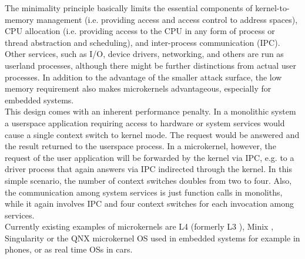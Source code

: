 The minimality principle basically limits the essential components of kernel-to-memory management (i.e. providing access and access control to address spaces), CPU allocation (i.e. providing access to the CPU in any form of process or thread abstraction and scheduling), and inter-process communication (IPC). Other services, such as I/O, device drivers, networking, and others are run as userland processes, although there might be further distinctions from actual user processes. In addition to the advantage of the smaller attack surface, the low memory requirement also makes microkernels advantageous, especially for embedded systems. \\

This design comes with an inherent performance penalty. In a monolithic system a userspace application requiring access to hardware or system services would cause a single context switch to kernel mode. The request would be answered and the result returned to the userspace process. In a microkernel, however, the request of the user application will be forwarded by the kernel via IPC, e.g. to a driver process that again answers via IPC indirected through the kernel. In this simple scenario, the number of context switches doubles from two to four. Also, the communication among system services is just function calls in monoliths, while it again involves IPC and four context switches for each invocation among services. \\

Currently existing examples of microkernels are L4 (formerly L3 \cite{liedtke1993persistent}), Minix \cite{herder2006minix}, Singularity \cite{hunt2005overview} or the QNX microkernel OS\cite{hildebrand1992architectural} used in embedded systems for example in phones, or as real time OSs in cars.\\

